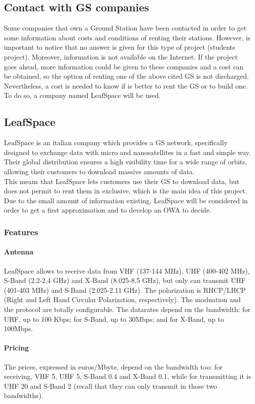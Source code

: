 \subsection{Contact with GS companies}
Some companies that own a Ground Station have been contacted in order to get some information about costs and conditions of renting their stations. However, is important to notice that no answer is given for this type of project (students project). Moreover, information is not available on the Internet. If the project goes ahead, more information could be given to these companies and a cost can be obtained, so the option of renting one of the above cited GS is not discharged. Nevertheless, a cost is needed to know if is better to rent the GS or to build one. To do so, a company named LeafSpace will be used.
\subsection{LeafSpace}
LeafSpace is an italian company which provides a GS network, specifically designed to exchange data with micro and nanosatellites in a fast and simple way. Their global distribution ensures a high visibility time for a wide range of orbits, allowing their customers to download massive amounts of data. \\
This means that LeafSpace lets customers use their GS to download data, but does not permit to rent them in exclusive, which is the main idea of this project. Due to the small amount of information existing, LeafSpace will be considered in order to get a first approximation and to develop an OWA to decide. 

\subsubsection{Features}
\paragraph{Antenna}
LeafSpace allows to receive data from VHF (137-144 MHz), UHF (400-402 MHz), S-Band (2.2-2.4 GHz) and X-Band (8.025-8.5 GHz), but only can transmit UHF (401-403 MHz) and S-Band (2.025-2.11 GHz). The polarization is RHCP/LHCP (Right and Left Hand Circular Polarization, respectively). The moduation and the protocol are totally configurable. The datarates depend on the bandwidth: for UHF, up to 100 Kbps; for S-Band, up to 30Mbps; and for X-Band, up to 100Mbps. 

\paragraph{Pricing}
The prices, expressed in euros/Mbyte, depend on the bandwidth too: for receiving, VHF 5, UHF 5, S-Band 0.4 and X-Band 0.1, while for transmitting it is UHF 20 and S-Band 2 (recall that they can only transmit in those two bandwidths). 

